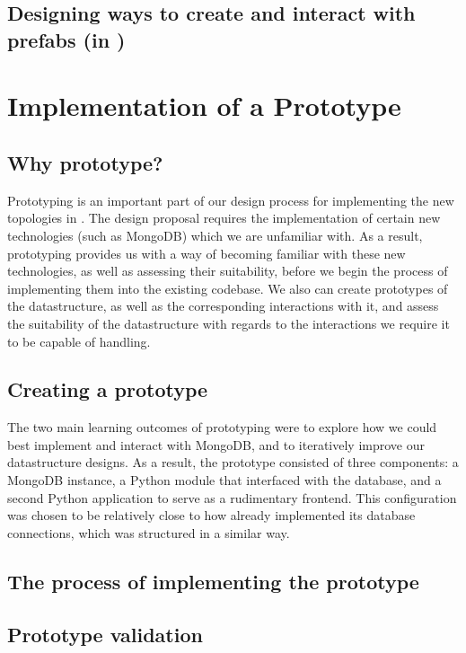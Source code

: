 \documentclass[11pt]{article}
\begin{document}
	\subsection{Designing ways to create and interact with prefabs (in \opendc{})}

\section{Implementation of a Prototype}

	\subsection{Why prototype?}
		Prototyping is an important part of our design process for implementing the new topologies in \opendc{}.
		The design proposal requires the implementation of certain new technologies (such as MongoDB) which we are unfamiliar with.
		As a result, prototyping provides us with a way of becoming familiar with these new technologies, as well as assessing their suitability, before we begin the process of implementing them into the existing \opendc{} codebase.
		We also can create prototypes of the datastructure, as well as the corresponding interactions with it, and assess the suitability of the datastructure with regards to the interactions we require it to be capable of handling.
	\subsection{Creating a prototype}
		The two main learning outcomes of prototyping were to explore how we could best implement and interact with MongoDB, and to iteratively improve our datastructure designs.
		As a result, the prototype consisted of three components: a MongoDB instance, a Python module that interfaced with the database, and a second Python application to serve as a rudimentary frontend. 
		This configuration was chosen to be relatively close to how \opendc{} already implemented its database connections, which was structured in a similar way. 
	\subsection{The process of implementing the prototype}

	\subsection{Prototype validation}
\end{document}
